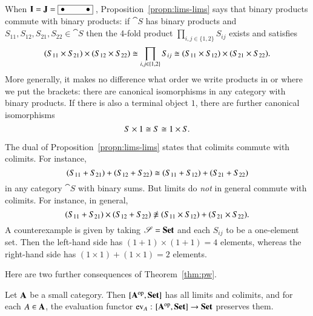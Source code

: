 \begin{example}        
\label{eg:lims-lims}
When $\mathbf{I} = \mathbf{J} = \fbox{$\bullet \hspace*{2.5em} \bullet$}\ $,
Proposition~\ref{propn:lims-lims} says that binary products commute with
binary products: if $\cat{S}$ has binary products and $S_{11}, S_{12},
S_{21}, S_{22} \in \cat{S}$ then the 4-fold product $\prod_{i, j \in \{1,
  2\}} S_{ij}$ exists and satisfies
\[
(S_{11} \times S_{21}) \times (S_{12} \times S_{22})
\cong
\prod_{i, j \in \{1, 2\}} S_{ij}
\cong
(S_{11} \times S_{12}) \times (S_{21} \times S_{22}).
\]
More generally, it makes no difference what order we write products in or
where we put the brackets: there are canonical isomorphisms
% 
% 
in any category with binary products.   If there is also a terminal object
$1$, there are further canonical isomorphisms
\[
S \times 1 
\cong 
S 
\cong 
1 \times S.
\]
\end{example}

\begin{warning}
The dual of Proposition~\ref{propn:lims-lims} states that colimits commute
with colimits.  For instance,
\[
(S_{11} + S_{21}) + (S_{12} + S_{22})
\cong
(S_{11} + S_{12}) + (S_{21} + S_{22})
\]
in any category $\cat{S}$ with binary sums.  But limits do \emph{not}%
%
%
in general commute with colimits.  For instance, in general,
\[
(S_{11} + S_{21}) \times (S_{12} + S_{22})
\not\iso
(S_{11} \times S_{12}) + (S_{21} \times S_{22}).
\]
A counterexample is given by taking $\mathscr{S} = \mathbf{Set}$ and each $S_{ij}$ to be a
one-element set.  Then the left-hand side has $(1 + 1) \times (1 + 1) = 4$
elements, whereas the right-hand side has $(1 \times 1) + (1 \times 1) = 2$
elements.
\end{warning}

Here are two further consequences of Theorem~\ref{thm:pw}.

\begin{cor}
%
% 
Let $\mathbf{A}$ be a small category.  Then $[\mathbf{A}^{\mathrm{op}},\mathbf{Set}]$ has all limits and
colimits, and for each $A \in \mathbf{A}$, the evaluation functor $\ev_A\from
\pshf{\scat{A}} \to \Set$ preserves them.
\end{cor}

